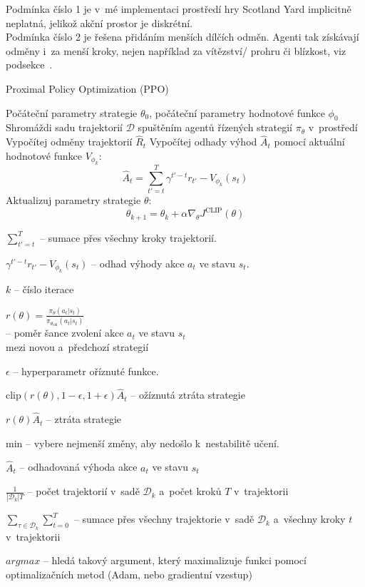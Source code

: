 Podmínka číslo 1 je v~mé implementaci prostředí hry Scotland Yard implicitně neplatná, jelikož akční prostor je diskrétní.\\
Podmínka číslo 2 je řešena přidáním menších dílčích odměn.
Agenti tak získávají odměny i~za menší kroky, nejen například za vítězství/ prohru či blízkost, viz podsekce~.\\

\pagebreak

\begin{algorithm}
  \caption{Proximal Policy Optimization (PPO)}
  \begin{algorithmic}[1]
  \State Počáteční parametry strategie $\theta_0$, počáteční parametry hodnotové funkce $\phi_0$
      \State Shromáždi sadu trajektorií $\mathcal{D}$ spuštěním agentů řízených strategií $\pi_\theta$ v~prostředí
      \State Vypočítej odměny trajektorií $\hat{R}_t$
      \State Vypočítej odhady výhod $\hat{A}_t$ pomocí aktuální hodnotové funkce $V_{\phi_k}$:
      \[
      \hat{A}_t = \sum_{t'=t}^T \gamma^{t'-t} r_{t'} - V_{\phi_k}(s_t)
      \]
      \State Aktualizuj parametry strategie $\theta$:
      \[
        \theta_{k+1} = \theta_k + \alpha \nabla_\theta J^{\text{CLIP}}(\theta)
      \]
    \EndFor
  \end{algorithmic}
  \end{algorithm}
  \begin{myitemize}
    \item $\sum_{t'=t}^T$ -- sumace přes všechny kroky trajektorií.
    \item $\gamma^{t'-t} r_{t'} - V_{\phi_k}(s_t)$ -- odhad výhody akce $a_t$ ve stavu $s_t$.
    \item $k$ -- číslo iterace
    \item $r(\theta) = \frac{\pi_\theta(a_t|s_t)}{\pi_{\theta_{\text{old}}}(a_t|s_t)}$\\ -- poměr šance zvolení akce $a_t$ ve stavu $s_t$ \\ mezi novou a~předchozí strategií
    \item $\epsilon$ -- hyperparametr oříznuté funkce.
    \item $\text{clip}(r(\theta), 1-\epsilon, 1+\epsilon) \hat{A}_t$ -- ožíznutá ztráta strategie
    \item $r(\theta) \hat{A}_t$ -- ztráta strategie
    \item min --  vybere nejmenší změny, aby nedošlo k~nestabilitě učení.
    \item $\hat{A}_t$ -- odhadovaná výhoda akce $a_t$ ve stavu $s_t$
    \item $\frac{1}{\left|\mathcal{D}_k\right|T}$ -- počet trajektorií v~sadě $\mathcal{D}_k$ a~počet kroků $T$ v~trajektorii
    \item $\displaystyle\sum_{\tau \in \mathcal{D}_k} \sum_{t=0}^T$ -- sumace přes všechny trajektorie v~sadě $\mathcal{D}_k$ a~všechny kroky $t$ v~trajektorii
    \item $argmax$ -- hledá takový argument, který maximalizuje funkci pomocí optimalizačních metod (Adam, nebo gradientní vzestup)
\end{myitemize}



